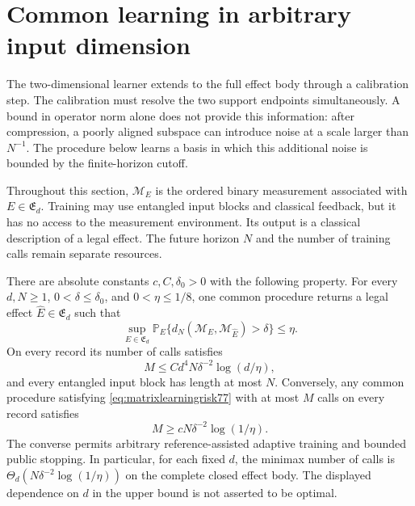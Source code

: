 \section{Common learning in arbitrary input dimension}
\label{sec:matrixlearning77}

The two-dimensional learner extends to the full effect body through a
calibration step.  The calibration must resolve the two support
endpoints simultaneously.  A bound in operator norm alone does not
provide this information: after compression, a poorly aligned
subspace can introduce noise at a scale larger than $N^{-1}$.  The
procedure below learns a basis in which this additional noise is
bounded by the finite-horizon cutoff.

Throughout this section, $\mathcal M_E$ is the ordered binary
measurement associated with $E\in\mathfrak E_d$.  Training may use
entangled input blocks and classical feedback, but it has no access
to the measurement environment.  Its output is a classical
description of a legal effect.  The future horizon $N$ and the number
of training calls remain separate resources.

\begin{theorem}
\label{thm:matrixlearning77}
There are absolute constants $c,C,\delta_0>0$ with the following
property.  For every $d,N\ge1$, $0<\delta\le\delta_0$, and
$0<\eta\le1/8$, one common procedure returns a legal effect
$\widehat E\in\mathfrak E_d$ such that
\begin{equation}\label{eq:matrixlearningrisk77}
 \sup_{E\in\mathfrak E_d}
 \mathbb P_E\{d_N(\mathcal M_E,\mathcal M_{\widehat E})>\delta\}
 \le\eta.
\end{equation}
On every record its number of calls satisfies
\begin{equation}\label{eq:matrixlearningcalls77}
 M\le C d^4N\delta^{-2}\log(d/\eta),
\end{equation}
and every entangled input block has length at most $N$.  Conversely,
any common procedure satisfying \eqref{eq:matrixlearningrisk77}
with at most $M$ calls on every record satisfies
\begin{equation}\label{eq:matrixlearninglower77}
 M\ge cN\delta^{-2}\log(1/\eta).
\end{equation}
The converse permits arbitrary reference-assisted adaptive training
and bounded public stopping.  In particular, for each fixed $d$, the
minimax number of calls is
$\Theta_d(N\delta^{-2}\log(1/\eta))$ on the complete closed effect
body.  The displayed dependence on $d$ in the upper bound is not
asserted to be optimal.
\end{theorem}

